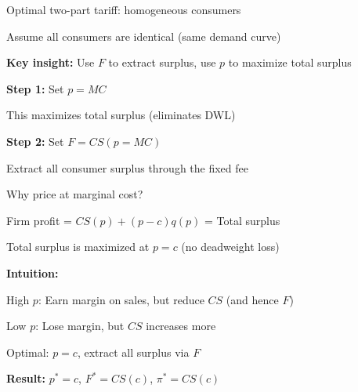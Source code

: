 \documentclass[notes,11pt, aspectratio=169]{beamer}
\newenvironment{wideitemize}{\itemize\addtolength{\itemsep}{10pt}}{\enditemize}
\begin{document}
\begin{frame}{Optimal two-part tariff: homogeneous consumers}
	\begin{wideitemize}
		\item Assume all consumers are identical (same demand curve)
		\item \textbf{Key insight:} Use $F$ to extract surplus, use $p$ to maximize total surplus
		\item \textbf{Step 1:} Set $p = MC$
		\begin{wideitemize}
			\vspace{5pt}
			\item This maximizes total surplus (eliminates DWL)
		\end{wideitemize}
		\item \textbf{Step 2:} Set $F = CS(p = MC)$
		\begin{wideitemize}
			\vspace{5pt}
			\item Extract all consumer surplus through the fixed fee
		\end{wideitemize}
	\end{wideitemize}
\end{frame}

\begin{frame}{Why price at marginal cost?}
	\begin{wideitemize}
		\item Firm profit = $CS(p) + (p - c)q(p)$ = Total surplus
		\item Total surplus is maximized at $p = c$ (no deadweight loss)
		\item \textbf{Intuition:}
		\begin{wideitemize}
			\vspace{5pt}
			\item High $p$: Earn margin on sales, but reduce $CS$ (and hence $F$)
			\item Low $p$: Lose margin, but $CS$ increases more
			\item Optimal: $p = c$, extract all surplus via $F$
		\end{wideitemize}
		\item \textbf{Result:} $p^* = c$, $F^* = CS(c)$, $\pi^* = CS(c)$
	\end{wideitemize}
\end{frame}
\end{document}

